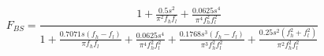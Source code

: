 \begin{equation}
F_{BS} = \frac{1 + \frac{0.5 s^{2}}{\pi^{2} f_{h} f_{l}} + \frac{0.0625 s^{4}}{\pi^{4} f_{h}^{2} f_{l}^{2}}}{1 + \frac{0.7071 s \left(f_{h} - f_{l}\right)}{\pi f_{h} f_{l}} + \frac{0.0625 s^{4}}{\pi^{4} f_{h}^{2} f_{l}^{2}} + \frac{0.1768 s^{3} \left(f_{h} - f_{l}\right)}{\pi^{3} f_{h}^{2} f_{l}^{2}} + \frac{0.25 s^{2} \left(f_{h}^{2} + f_{l}^{2}\right)}{\pi^{2} f_{h}^{2} f_{l}^{2}}}
\end{equation}

